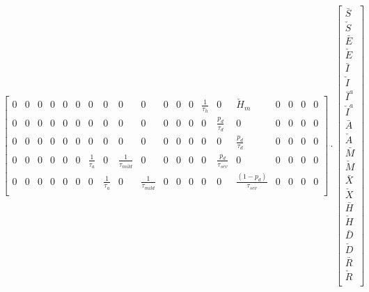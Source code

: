 \documentclass[notitlepage, superscriptaddress]{revtex4-2}
\begin{document}
\begin{eqnarray}
\begin{bmatrix}
0 & 0 & 0 & 0 & 0 & 0 & 0 & 0 & 0 & 0 & 0 & 0 & 0 & \frac{1}{\tau_{h}} & 0 & \check{H}_{m} & 0 & 0 & 0 & 0 \\[.1cm] 
0 & 0 & 0 & 0 & 0 & 0 & 0 & 0 & 0 & 0 & 0 & 0 & 0 & 0 & \frac{p_{d}}{\tau_{d}} & 0 & 0 & 0 & 0 & 0 \\[.1cm] 
0 & 0 & 0 & 0 & 0 & 0 & 0 & 0 & 0 & 0 & 0 & 0 & 0 & 0 & 0 & \frac{p_{d}}{\tau_{d}} & 0 & 0 & 0 & 0 \\[.1cm]
0 & 0 & 0 & 0 & 0 & 0 & \frac{1}{\tau_{a}} & 0 & \frac{1}{\tau_{mild}} & 0 & 0 & 0 & 0 & 0 & \frac{p_{d}}{\tau_{sev}} & 0 & 0 & 0 & 0 & 0 \\[.1cm]
0 & 0 & 0 & 0 & 0 & 0 & 0 & \frac{1}{\tau_{a}} & 0 & \frac{1}{\tau_{mild}} & 0 & 0 & 0 & 0 & 0 & \frac{(1-p_{d})}{\tau_{sev}} & 0 & 0 & 0 & 0 \nonumber \\[.1cm]
\end{bmatrix}
%
\cdot
\begin{bmatrix}
\bar{S} \\[.1cm]
\check{S} \\[.1cm]
\bar{E} \\[.1cm]
\check{E} \\[.1cm]
\bar{I} \\[.1cm]
\check{I} \\[.1cm]
\bar{I}^{a} \\[.1cm]
\check{I}^{a} \\[.1cm]
\bar{A} \\[.1cm]
\check{A} \\[.1cm]
\bar{M} \\[.1cm]
\check{M} \\[.1cm]
\bar{X} \\[.1cm]
\check{X} \\[.1cm]
\bar{H} \\[.1cm]
\check{H} \\[.1cm]
\bar{D} \\[.1cm]
\check{D} \\[.1cm]
\bar{R} \\[.1cm]
\check{R} \\[.1cm]

\end{bmatrix}
\end{eqnarray}
\end{document}
